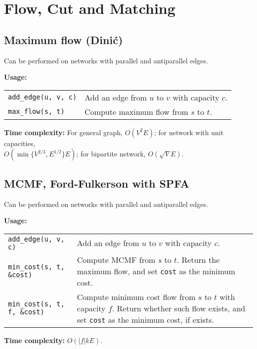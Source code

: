 \section{Flow, Cut and Matching}
\subsection{Maximum flow (Dini\'c)}
\Tick Can be performed on networks with parallel and antiparallel edges.\par
\textbf{Usage:} \\[0.1cm]
\begin{tabular}{p{3.5cm} p{8cm}}
  \lstinline|add_edge(u, v, c)| & Add an edge from $u$ to $v$ with capacity $c$. \\
  \lstinline|max_flow(s, t)| & Compute maximum flow from $s$ to $t$. \\
\end{tabular} \par
\textbf{Time complexity:} For general graph, $O(V^2E)$; for network with unit capacities, \\ $O(\min\{V^{2/3}, E^{1/2}\}E)$; for bipartite network, $O(\sqrt{V}E)$. \par


\subsection{MCMF, Ford-Fulkerson with SPFA}
\Tick Can be performed on networks with parallel and antiparallel edges.\par
\textbf{Usage:} \\[0.1cm]
\begin{tabular}{p{4.5cm} p{7cm}}
  \lstinline|add_edge(u, v, c)| & Add an edge from $u$ to $v$ with capacity $c$. \\
  \lstinline|min_cost(s, t, &cost)| & Compute MCMF from $s$ to $t$. Return the maximum flow, and set \lstinline|cost| as the minimum cost. \\
  \lstinline|min_cost(s, t, f, &cost)| & Compute minimum cost flow from $s$ to $t$ with capacity $f$. Return whether such flow exists, and set \lstinline|cost| as the minimum cost, if exists. \\
\end{tabular} \par
\textbf{Time complexity:} $O(|f|kE)$. \par


